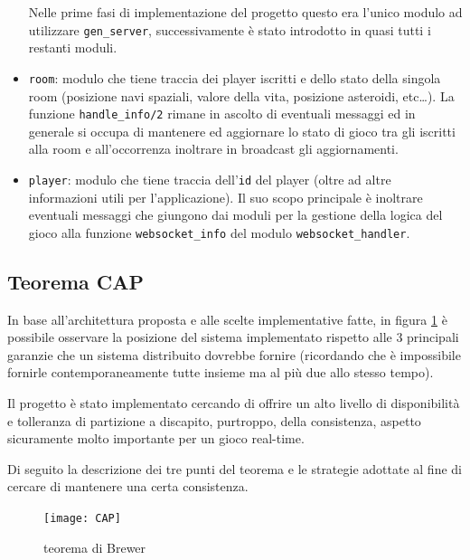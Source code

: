 \documentclass[paper=a4, fontsize=11pt]{scrartcl} %
\numberwithin{equation}{section} %
\numberwithin{figure}{section} %
\numberwithin{table}{section} %
\begin{document}
\begin{itemize}
Nelle prime fasi di implementazione del progetto questo era l'unico modulo ad utilizzare \texttt{gen\_server}, successivamente è stato introdotto in quasi tutti i restanti moduli. 

\item \texttt{room}: modulo che tiene traccia dei player iscritti e dello stato della singola room (posizione navi spaziali, valore della vita, posizione asteroidi, etc\dots).
La funzione \texttt{handle\_info/2} rimane in ascolto di eventuali messaggi ed in generale si occupa di mantenere ed aggiornare lo stato di gioco tra gli iscritti alla room e all'occorrenza inoltrare in broadcast gli aggiornamenti.
\item \texttt{player}: modulo che tiene traccia dell'\texttt{id} del player (oltre ad altre informazioni utili per l'applicazione). Il suo scopo principale è inoltrare eventuali messaggi che giungono dai moduli per la gestione della logica del gioco alla funzione \texttt{websocket\_info} del modulo \texttt{websocket\_handler}.
\end{itemize}

\subsection{Teorema CAP}
In base all'architettura proposta e alle scelte implementative fatte, in figura \ref{CAP} è possibile osservare la posizione del sistema implementato rispetto alle 3 principali garanzie che un sistema distribuito dovrebbe fornire (ricordando che è impossibile fornirle contemporaneamente tutte insieme ma al più due allo stesso tempo).

Il progetto è stato implementato cercando di offrire un alto livello di disponibilità e tolleranza di partizione a discapito, purtroppo, della consistenza, aspetto sicuramente molto importante per un gioco real-time.

Di seguito la descrizione dei tre punti del teorema e le strategie adottate al fine di cercare di mantenere una certa consistenza.
\begin{figure}
\centering
\texttt{[image: CAP]}
\caption{teorema di Brewer}
\label{CAP}
\end{figure}
\end{document}
